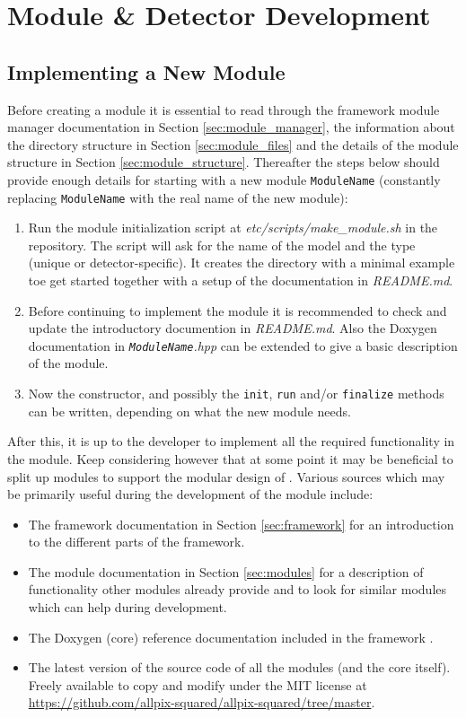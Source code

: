 \section{Module \& Detector Development}
\subsection{Implementing a New Module}
\label{sec:building_new_module}
Before creating a module it is essential to read through the framework module manager documentation in Section \ref{sec:module_manager}, the information about the directory structure in Section \ref{sec:module_files} and the details of the module structure in Section \ref{sec:module_structure}. Thereafter the steps below should provide enough details for starting with a new module \texttt{ModuleName} (constantly replacing  \texttt{ModuleName} with the real name of the new module):
\begin{enumerate}
\item Run the module initialization script at \textit{etc/scripts/make\_module.sh} in the repository. The script will ask for the name of the model and the type (unique or detector-specific). It creates the directory with a minimal example toe get started together with a setup of the documentation in \textit{README.md}.
\item Before continuing to implement the module it is recommended to check and update the introductory documention in \textit{README.md}. Also the Doxygen documentation in \textit{\texttt{ModuleName}.hpp} can be extended to give a basic description of the module.
\item Now the constructor, and possibly the \texttt{init}, \texttt{run} and/or \texttt{finalize} methods can be written, depending on what the new module needs.
\end{enumerate}

After this, it is up to the developer to implement all the required functionality in the module. Keep considering however that at some point it may be beneficial to split up modules to support the modular design of \apsq. Various sources which may be primarily useful during the development of the module include:
\begin{itemize}
\item The framework documentation in Section \ref{sec:framework} for an introduction to the different parts of the framework.
\item The module documentation in Section \ref{sec:modules} for a description of functionality other modules already provide and to look for similar modules which can help during development.
\item The Doxygen (core) reference documentation included in the framework .
\item The latest version of the source code of all the modules (and the core itself). Freely available to copy and modify under the MIT license at \url{https://github.com/allpix-squared/allpix-squared/tree/master}.
\end{itemize}

